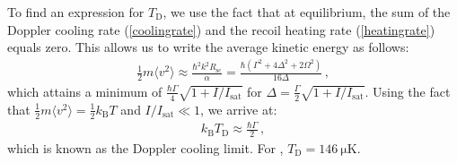 \documentclass[../Thesis-IJspeert.tex]{subfiles}
\begin{document}
To find an expression for $T_\mathrm{D}$, we use the fact that at equilibrium, the sum of the Doppler cooling rate (\autoref{coolingrate}) and the recoil heating rate (\autoref{heatingrate}) equals zero. This allows us to write the average kinetic energy as follows:
\begin{align}
	 \frac{1}{2}m\langle v^2\rangle \approx \frac{\hbar^2 k^2 R_\mathrm{sc}}{\alpha}= \frac{\hbar\left(\Gamma^2+4\Delta^2+2\Omega^2\right)}{16\Delta}\,,
\label{dopplerlimit}
\end{align}
which attains a minimum of $\frac{\hbar\Gamma}{4}\sqrt{1+I/I_\mathrm{sat}}$ for $\Delta=\frac{\Gamma}{2}\sqrt{1+I/I_\mathrm{sat}}$. Using the fact that $\frac{1}{2}m\langle v^2\rangle = \frac{1}{2}k_\mathrm{B}T$ and $I/I_\mathrm{sat}\ll 1$, we arrive at:
\begin{align}
	k_\mathrm{B}T_\mathrm{D} \approx \frac{\hbar\Gamma}{2}\,,
\end{align}
which is known as the Doppler cooling limit. For , $T_\mathrm{D}=\SI{146}{\micro\kelvin}$.
\end{document}
